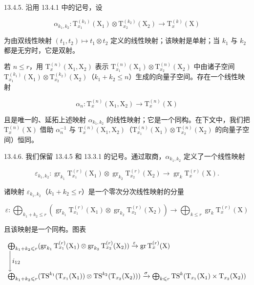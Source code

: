 13.4.5. 沿用 13.4.1 中的记号，设

\[
\alpha_ {k _ {1}, k _ {2}} \colon \mathrm{T} _ {x _ {1}} ^ {(k _ {1})} (\mathrm{X} _ {1}) \otimes \mathrm{T} _ {x _ {2}} ^ {(k _ {2})} (\mathrm{X} _ {2}) \rightarrow \mathrm{T} _ {x} ^ {(k)} (\mathrm{X})
\]

为由双线性映射 \((t_{1}, t_{2}) \mapsto t_{1} \otimes t_{2}\) 定义的线性映射；该映射是单射；当 \(k_{1}\) 与 \(k_{2}\) 都是无穷时，它是双射。

若 \(n \leqslant r\)，用 \(\mathrm{T}_{x}^{(n)}(\mathrm{X}_{1}, \mathrm{X}_{2})\) 表示 \(\mathrm{T}_{x_{1}}^{(n)}(\mathrm{X}_{1}) \otimes \mathrm{T}_{x_{2}}^{(n)}(\mathrm{X}_{2})\) 中由诸子空间 \(\mathrm{T}_{x_{1}}^{(k_{1})}(\mathrm{X}_{1}) \otimes \mathrm{T}_{x_{2}}^{(k_{2})}(\mathrm{X}_{2})\)（\(k_{1} + k_{2} \leqslant n\)）生成的向量子空间。存在一个线性映射

\[
\alpha_ {n} \colon \mathrm{T} _ {x} ^ {(n)} (\mathrm{X} _ {1}, \mathrm{X} _ {2}) \rightarrow \mathrm{T} _ {x} ^ {(n)} (\mathrm{X})
\]

且是唯一的、延拓上述映射 \(\alpha_{k_1,k_2}\) 的线性映射；它是一个同构。在下文中，我们把 \(\mathrm{T}_x^{(n)}(\mathrm{X})\) 借助 \(\alpha_n^{-1}\) 与 \(\mathrm{T}_x^{(n)}(\mathrm{X}_1,\mathrm{X}_2)\)（\(\mathrm{T}_{x_1}^{(n)}(\mathrm{X}_1)\otimes \mathrm{T}_{x_2}^{(n)}(\mathrm{X}_2)\) 的向量子空间）恒同。

13.4.6. 我们保留 13.4.5 和 13.3.1 的记号。通过取商，\(\alpha_{k_1,k_2}\) 定义了一个线性映射

\[
\varepsilon_ {k _ {1}, k _ {2}} \colon \operatorname{gr} _ {k _ {1}} \mathrm{T} _ {x _ {1}} ^ {(r)} (\mathrm{X} _ {1}) \otimes \operatorname{gr} _ {k _ {2}} \mathrm{T} _ {x _ {2}} ^ {(r)} (\mathrm{X} _ {2}) \rightarrow \operatorname{gr} _ {k} \mathrm{T} _ {x} ^ {(r)} (\mathrm{X}).
\]

诸映射 \(\varepsilon_{k_1,k_2}\)（\(k_1 + k_2 \leqslant r\)）是一个零次分次线性映射的分量

\[
\varepsilon : \bigoplus_ {k _ {1} + k _ {2} \leqslant r} \left(\operatorname{gr} _ {k _ {1}} \mathrm{T} _ {x _ {1}} ^ {(r)} (\mathrm{X} _ {1}) \otimes \operatorname{gr} _ {k _ {2}} \mathrm{T} _ {x _ {2}} ^ {(r)} (\mathrm{X} _ {2})\right)\rightarrow \bigoplus_ {k \leqslant r} \operatorname{gr} _ {k} \mathrm{T} _ {x} ^ {(r)} (\mathrm{X})
\]

且该映射是一个同构。图表

\[
\begin{array}{l} \bigoplus_ {k _ {1} + k _ {2} \leqslant r} (\operatorname{gr} _ {k _ {1}} \mathrm{T} _ {x _ {1}} ^ {(r)} (\mathrm{X} _ {1}) \otimes \operatorname{gr} _ {k _ {2}} \mathrm{T} _ {x _ {2}} ^ {(r)} (\mathrm{X} _ {2})) \xrightarrow {\varepsilon} \operatorname{gr} \mathrm{T} _ {x} ^ {(r)} (\mathrm{X}) \\ \Biggl \downarrow i _ {1 2} \\ \bigoplus_ {k _ {1} + k _ {2} \leqslant r} (\mathrm{TS} ^ {k _ {1}} (\mathrm{T} _ {x _ {1}} (\mathrm{X} _ {1})) \otimes \mathrm{TS} ^ {k _ {2}} (\mathrm{T} _ {x _ {2}} (\mathrm{X} _ {2}))) \xrightarrow {\sigma} \bigoplus_ {k \leqslant r} \mathrm{TS} ^ {k} (\mathrm{T} _ {x _ {1}} (\mathrm{X} _ {1}) \times \mathrm{T} _ {x _ {2}} (\mathrm{X} _ {2})) \end{array}
\]

